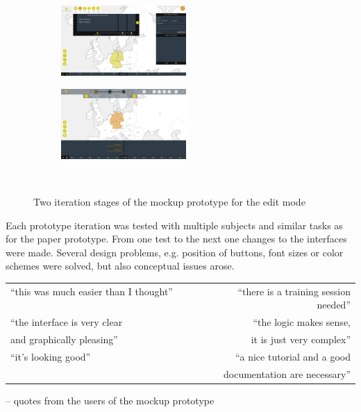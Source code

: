 \begin{figure}[ht]
  \vspace{1em}
  \centering
  \begin{subfigure}[b]{.5\textwidth}
    \centering
    \includegraphics[width=180px]{graphics/development/user_interface_design_process/mockup_prototype_1.png}
  \end{subfigure}%
  \begin{subfigure}[b]{.5\textwidth}
    \centering
    \includegraphics[width=180px]{graphics/development/user_interface_design_process/mockup_prototype_3.png}
  \end{subfigure} \\[0.8em]
  \caption{Two iteration stages of the mockup prototype for the edit mode}
  \label{fig:mockup_prototypes}
\end{figure}

Each prototype iteration was tested with multiple subjects and similar tasks as for the paper prototype. From one test to the next one changes to the interfaces were made. Several design problems, e.g. position of buttons, font sizes or color schemes were solved, but also conceptual issues arose.

\begin{quoteit}
  \begin{tabular}{l r}
    ``this was much easier than I thought'' ~~~~~~~~ &
    ``there is a training session needed'' \\[0.5em]
    ``the interface is very clear &
    ``the logic makes sense, \\
    and graphically pleasing'' &
    it is just very complex'' \\[0.5em]
    ``it's looking good'' &
    ``a nice tutorial and a good \\
    & documentation are necessary'' \\
  \end{tabular}
\end{quoteit}
\vspace{-1em}
\hfill -- quotes from the users of the mockup prototype

